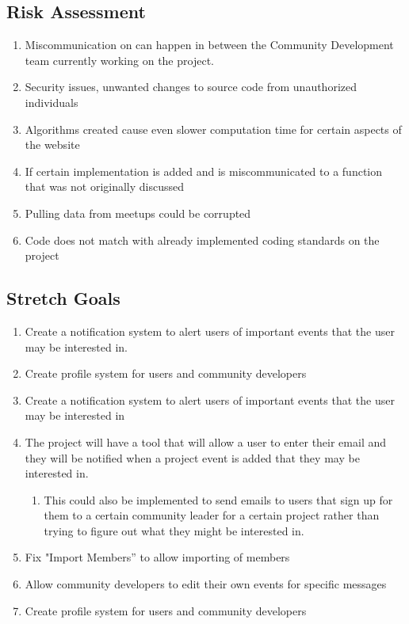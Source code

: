 \documentclass[draftclsnofoot,10pt,onecolumn]{IEEEtran} %
\begin{document}
\subsection{Risk Assessment}
\begin{enumerate}
\item Miscommunication on can happen in between the Community Development team currently working on the project.
\item Security issues, unwanted changes to source code from unauthorized individuals
\item Algorithms created cause even slower computation time for certain aspects of the website
\item If certain implementation is added and is miscommunicated to a function that was not originally discussed
\item Pulling data from meetups could be corrupted
\item Code does not match with already implemented coding standards on the project
\end{enumerate}

\subsection{Stretch Goals}
\begin{enumerate}
\item Create a notification system to alert users of important events that the user may be interested in.
\item Create profile system for users and community developers
\item Create a notification system to alert users of important events that the user may be interested in
\item The project will have a tool that will allow a user to enter their email and they will be notified when a project event is added that they may be interested in.
\begin{enumerate}
\item This could also be implemented to send emails to users that sign up for them to a certain community leader for a certain project rather than trying to figure out what they might be interested in.
\end{enumerate}

\item Fix "Import Members” to allow importing of members
\item Allow community developers to edit their own events for specific messages
\item Create profile system for users and community developers
\end{enumerate}
\end{document}
